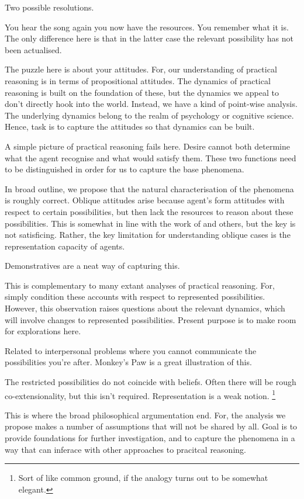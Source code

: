\documentclass[10pt]{article}
\begin{document}
Two possible resolutions.

You hear the song again you now have the resources.
You remember what it is.
The only difference here is that in the latter case the relevant possibility has not been actualised.

The puzzle here is about your attitudes.
For, our understanding of practical reasoning is in terms of propositional attitudes.
The dynamics of practical reasoning is built on the foundation of these, but the dynamics we appeal to don't directly hook into the world.
Instead, we have a kind of point-wise analysis.
The underlying dynamics belong to the realm of psychology or cognitive science.
Hence, task is to capture the attitudes so that dynamics can be built.

A simple picture of practical reasoning fails here.
Desire cannot both determine what the agent recognise and what would satisfy them.
These two functions need to be distinguished in order for us to capture the base phenomena.

In broad outline, we propose that the natural characterisation of the phenomena is roughly correct.
Oblique attitudes arise because agent's form attitudes with respect to certain possibilities, but then lack the resources to reason about these possibilities.
This is somewhat in line with the work of \citeauthor{Simon:1997aa} and others, but the key is not satisficing.
Rather, the key limitation for understanding oblique cases is the representation capacity of agents.

Demonstratives are a neat way of capturing this.

This is complementary to many extant analyses of practical reasoning.
For, simply condition these accounts with respect to represented possibilities.
However, this observation raises questions about the relevant dynamics, which will involve changes to represented possibilities.
Present purpose is to make room for explorations here.

Related to interpersonal problems where you cannot communicate the possibilities you're after.
Monkey's Paw is a great illustration of this.

The restricted possibilities do not coincide with beliefs.
Often there will be rough co-extensionality, but this isn't required.
Representation is a weak notion.\nolinebreak
\footnote{Sort of like common ground, if the analogy turns out to be somewhat elegant.}


This is where the broad philosophical argumentation end.
For, the analysis we propose makes a number of assumptions that will not be shared by all.
Goal is to provide foundations for further investigation, and to capture the phenomena in a way that can inferace with other approaches to pracitcal reasoning.
\end{document}
